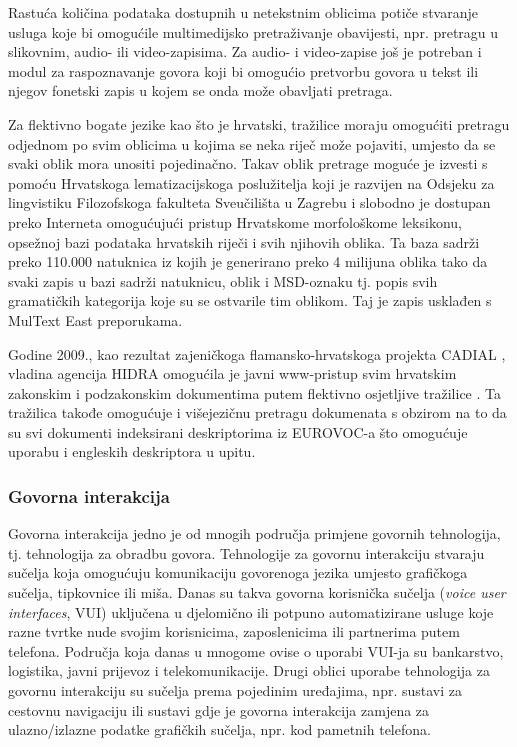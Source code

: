 \begin{multicols}{2}
Rastuća količina podataka dostupnih u netekstnim oblicima potiče stvaranje usluga koje bi omogućile multimedijsko pretraživanje obavijesti, npr. pretragu u slikovnim, audio- ili video-zapisima. Za audio- i video-zapise još je potreban i modul za raspoznavanje govora koji bi omogućio pretvorbu govora u tekst ili njegov fonetski zapis u kojem se onda može obavljati pretraga.

Za flektivno bogate jezike kao što je hrvatski, tražilice moraju omogućiti pretragu odjednom po svim oblicima u kojima se neka riječ može pojaviti, umjesto da se svaki oblik mora unositi pojedinačno. Takav oblik pretrage moguće je izvesti s pomoću Hrvatskoga lematizacijskoga poslužitelja koji je razvijen na Odsjeku za lingvistiku Filozofskoga fakulteta Sveučilišta u Zagrebu i slobodno je dostupan preko Interneta \cite{str16} omogućujući pristup Hrvatskome morfološkome leksikonu, opsežnoj bazi podataka hrvatskih riječi i svih njihovih oblika. Ta baza sadrži preko 110.000 natuknica iz kojih je generirano preko 4 milijuna oblika tako da svaki zapis u bazi sadrži natuknicu, oblik i MSD-oznaku tj. popis svih gramatičkih kategorija koje su se ostvarile tim oblikom. Taj je zapis usklađen s MulText East \cite{str17} preporukama.

Godine 2009., kao rezultat zajeničkoga flamansko-hrvatskoga projekta CADIAL \cite{str18}, vladina agencija HIDRA omogućila je javni www-pristup svim hrvatskim zakonskim i podzakonskim dokumentima putem flektivno osjetljive tražilice \cite{str19}. Ta tražilica takođe omogućuje i višejezičnu pretragu dokumenata s obzirom na to da su svi dokumenti indeksirani deskriptorima iz EUROVOC-a što omogućuje uporabu i engleskih deskriptora u upitu.
  
\subsubsection{Govorna interakcija}

Govorna interakcija jedno je od mnogih područja primjene govornih tehnologija, tj. tehnologija za obradbu govora. Tehnologije za govornu interakciju stvaraju sučelja koja omogućuju komunikaciju govorenoga jezika umjesto grafičkoga sučelja, tipkovnice ili miša. Danas su takva govorna korisnička sučelja (\emph{voice user interfaces}, VUI) uključena u djelomično ili potpuno automatizirane usluge koje razne tvrtke nude svojim korisnicima, zaposlenicima ili partnerima putem telefona. Područja koja danas u mnogome ovise o uporabi VUI-ja su bankarstvo, logistika, javni prijevoz i telekomunikacije. Drugi oblici uporabe tehnologija za govornu interakciju su sučelja prema pojedinim uređajima, npr. sustavi za cestovnu navigaciju ili sustavi gdje je govorna interakcija zamjena za ulazno/izlazne podatke grafičkih sučelja, npr. kod pametnih telefona.


\end{multicols}
